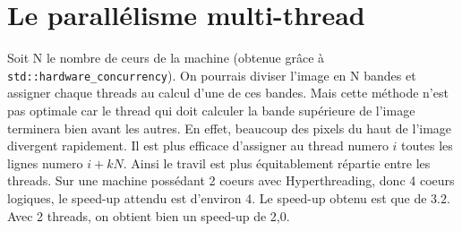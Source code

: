 \documentclass{article}
\begin{document}
\section{Le parallélisme multi-thread}
Soit N le nombre de ceurs de la machine (obtenue grâce à \texttt{std::hardware\_concurrency}). On pourrais diviser
l’image en N bandes et assigner chaque threads au calcul d’une de ces bandes. Mais cette méthode n’est pas
optimale car le thread qui doit calculer la bande supérieure de l’image terminera bien avant les autres. En effet,
beaucoup des pixels du haut de l’image divergent rapidement. Il est plus efficace d’assigner au thread numero $i$
toutes les lignes numero $i + kN$. Ainsi le travil est plus équitablement répartie entre les threads. Sur une machine
possédant 2 coeurs avec Hyperthreading, donc 4 coeurs logiques, le speed-up attendu est d’environ 4. Le speed-up
obtenu est que de $3.2$. Avec 2 threads, on obtient bien un speed-up de 2,0.
\end{document}
